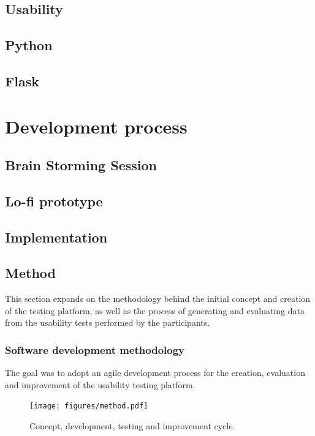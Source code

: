\documentclass[nofilelist,dvipsnames]{cslthse-msc}
\begin{document}
    \section{Usability}

    \section{Python}

    \section{Flask}


	\chapter{Development process}

		\section{Brain Storming Session}

		\section{Lo-fi prototype}

    \section{Implementation}

		\section{Method}

      This section expands on the methodology behind the initial concept and
      creation of the testing platform, as well as the process of generating
      and evaluating data from the usability tests performed by the participants.

      \subsection{Software development methodology}

        The goal was to adopt an agile development process{\findref} for the
        creation, evaluation and improvement of the usability testing platform.

        \begin{figure}[h!]
          \centering
          \texttt{[image: figures/method.pdf]}
          \caption{Concept, development, testing and improvement cycle.}
        \end{figure}
\end{document}
